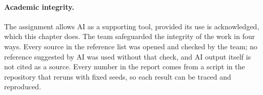 \paragraph{Academic integrity.} The assignment allows AI as a supporting tool,
provided its use is acknowledged, which this chapter does. The team safeguarded
the integrity of the work in four ways. Every source in the reference list was
opened and checked by the team; no reference suggested by AI was used without
that check, and AI output itself is not cited as a source. Every number in the
report comes from a script in the repository that reruns with fixed seeds, so
each result can be traced and reproduced.
